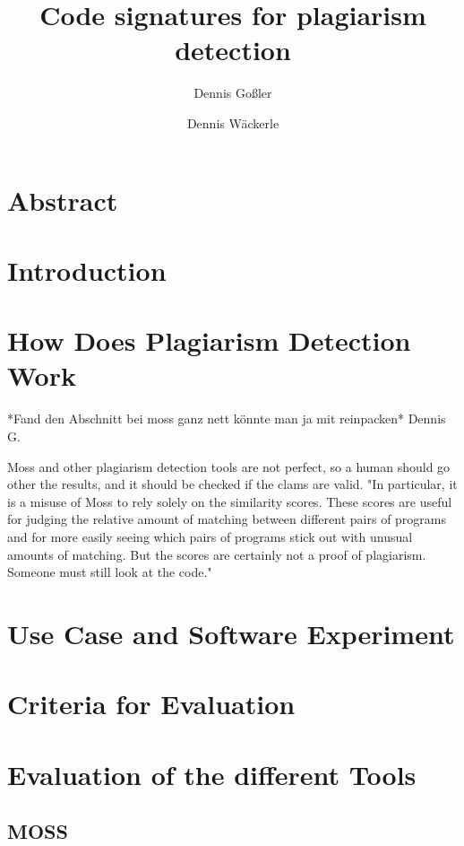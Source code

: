 \documentclass[a4paper, 11pt]{article}
\renewcommand{\\}{\vspace*{0.5\baselineskip} \newline}
\begin{document}
\title{Code signatures for plagiarism detection}
\author{Dennis Goßler \and Dennis Wäckerle}
\maketitle

\section*{Abstract}
\newpage
\tableofcontents
\newpage

\section{Introduction}

\section{How Does Plagiarism Detection Work}


*Fand den Abschnitt bei moss ganz nett könnte man ja mit reinpacken* Dennis G.

Moss and other plagiarism detection tools are not perfect, so a human should go other the results, and it should be checked if the clams are valid.
"In particular, it is a misuse of Moss to rely solely on the similarity scores. These scores are useful for judging the relative amount of matching between different pairs of programs and for more easily seeing which pairs of programs stick out with unusual amounts of matching. But the scores are certainly not a proof of plagiarism. Someone must still look at the code."
\autocite{SMOSS}

\section{Use Case and Software Experiment}

\section{Criteria for Evaluation}

\section{Evaluation of the different Tools}

\subsection{MOSS}
\end{document}
